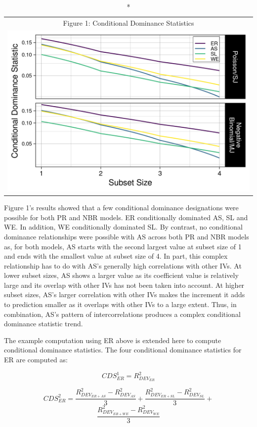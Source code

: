 \documentclass[ShortAfour,times,sageapa]{sagej}
\begin{document}
	\begin{longtable}{c}
		\caption*{
			{\large Figure 1: Conditional Dominance Statistics}
		} \\ 
		\includegraphics{includes/condit_gph}
	\end{longtable}

	Figure 1's results showed that a few conditional dominance designations were possible for both PR and NBR models.
	ER conditionally dominated AS, SL and WE. 
	In addition, WE conditionally dominated SL.
	By contrast, no conditional dominance relationships were possible with AS across both PR and NBR models as, for both models, AS starts with the second largest value at subset size of 1 and ends with the smallest value at subset size of 4.
	In part, this complex relationship has to do with AS's generally high correlations with other IVs. 
	At lower subset sizes, AS shows a larger value as its coefficient value is relatively large and its overlap with other IVs has not been taken into account.
	At higher subset sizes, AS's larger correlation with other IVs makes the increment it adds to prediction smaller as it overlaps with other IVs to a large extent.
	Thus, in combination, AS's pattern of intercorrelations produces a complex conditional dominance statistic trend.
	
	The example computation using ER above is extended here to compute conditional dominance statistics.
	The four conditional dominance statistics for ER are computed as:
	
	$$CDS^1_{ER} = R^2_{DEV_{ER}}$$
	
	$$CDS^2_{ER} = \frac{R^2_{DEV_{ER + AS}} - R^2_{DEV_{AS}}}{3} + \frac{R^2_{DEV_{ER + SL}} - R^2_{DEV_{SL}}}{3} + $$
	$$\frac{R^2_{DEV_{ER + WE}} - R^2_{DEV_{WE}}}{3}$$
	
\end{document}
